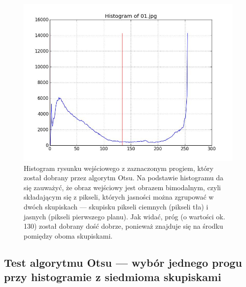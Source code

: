 \documentclass[10pt]{llncs}
\begin{document}
\begin{figure}[h!]
  \centering
  \includegraphics[scale=.3, clip]{img/01_histogram.jpg}
	\caption[]
  {Histogram rysunku wejściowego z zaznaczonym progiem, który został dobrany przez algorytm Otsu. Na podstawie histogramu da się zauważyć, że obraz wejściowy jest obrazem bimodalnym, czyli składającym się z pikseli, których jasności można zgrupować w dwóch skupiskach --- skupisku pikseli ciemnych (pikseli tła) i jasnych (pikseli pierwszego planu). Jak widać, próg (o wartości ok. 130) został dobrany dość dobrze, ponieważ znajduje się na środku pomiędzy oboma skupiskami.}
\end{figure}

\subsection{Test algorytmu Otsu --- wybór jednego progu przy histogramie z siedmioma skupiskami}
\end{document}
